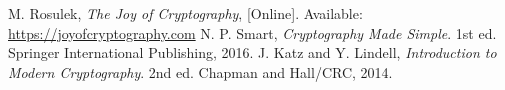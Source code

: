 \documentclass[12pt,openany]{book}
\theoremstyle{definition}
\begin{document}
	\newpage
	\begin{thebibliography}{9}
		M. Rosulek, \textit{The Joy of Cryptography}, [Online]. Available: \url{https://joyofcryptography.com}
		N. P. Smart, \textit{Cryptography Made Simple}. 1st ed. Springer International Publishing, 2016.
		J. Katz and Y. Lindell, \textit{Introduction to Modern Cryptography}. 2nd ed. Chapman and Hall/CRC, 2014.	
\end{thebibliography}

\end{document}

